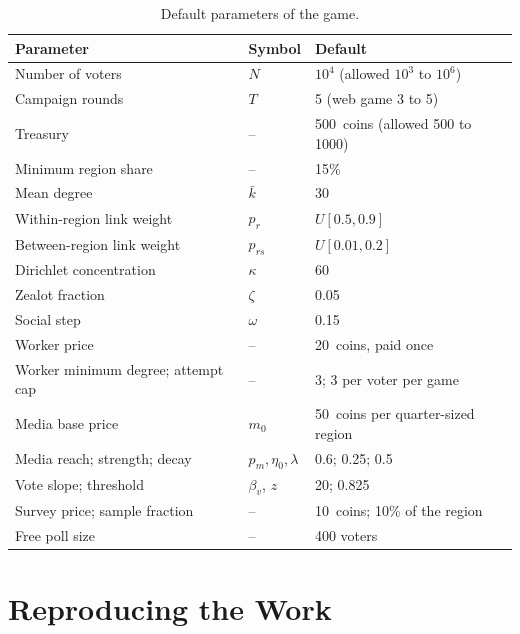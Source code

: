 \documentclass[11pt,a4paper,oneside]{report}
\newcommand{\coins}[1]{#1~coins}
\begin{document}
\begin{table}[h]
\centering
\caption{Default parameters of the game.}
\label{tab:params}
\small
\begin{tabularx}{\linewidth}{@{}Xll@{}}
\toprule
Parameter & Symbol & Default \\
\midrule
Number of voters                          & $N$            & $10^4$ (allowed $10^3$ to $10^6$) \\
Campaign rounds                           & $T$            & 5 (web game 3 to 5) \\
Treasury                                  & --             & \coins{500} (allowed 500 to 1000) \\
Minimum region share                      & --             & 15\% \\
Mean degree                               & $\bar k$       & 30 \\
Within-region link weight                 & $p_r$          & $U[0.5, 0.9]$ \\
Between-region link weight                & $p_{rs}$       & $U[0.01, 0.2]$ \\
Dirichlet concentration                   & $\kappa$       & 60 \\
Zealot fraction                           & $\zeta$        & 0.05 \\
Social step                               & $\omega$       & 0.15 \\
Worker price                              & --             & \coins{20}, paid once \\
Worker minimum degree; attempt cap        & --             & 3; 3 per voter per game \\
Media base price                          & $m_0$          & \coins{50} per quarter-sized region \\
Media reach; strength; decay              & $p_m,\eta_0,\lambda$ & 0.6; 0.25; 0.5 \\
Vote slope; threshold                     & $\beta_v$, $z$ & 20; 0.825 \\
Survey price; sample fraction             & --             & \coins{10}; 10\% of the region \\
Free poll size                            & --             & 400 voters \\
\bottomrule
\end{tabularx}
\end{table}

\chapter{Reproducing the Work}\label{app:repro}
\end{document}
